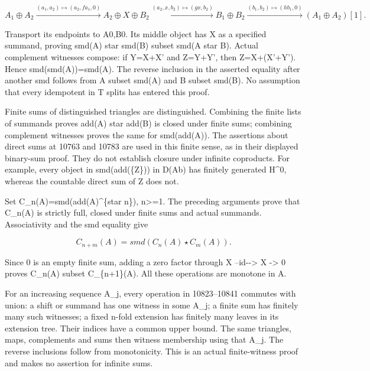 \[
 A_1\oplus A_2
 \xrightarrow{(a_1,a_2)\mapsto(a_2,f a_1,0)}
 A_2\oplus X\oplus B_2
 \xrightarrow{(a_2,x,b_2)\mapsto(gx,b_2)}
 B_1\oplus B_2
 \xrightarrow{(b_1,b_2)\mapsto(hb_1,0)}
 (A_1\oplus A_2)[1].
\]

Transport its endpoints to A0,\allowbreak{}B0. Its middle object has X as a specified summand,\allowbreak{} proving smd(A)\allowbreak{} star smd(B)\allowbreak{} subset smd(A star B)\allowbreak{}. Actual complement witnesses compose:\allowbreak{} if Y\allowbreak{}=X\allowbreak{}+X' and Z\allowbreak{}=Y\allowbreak{}+Y',\allowbreak{} then Z\allowbreak{}=X\allowbreak{}+(X'\allowbreak{}+Y')\allowbreak{}. Hence smd(smd(A)\allowbreak{})\allowbreak{}\allowbreak{}=smd(A)\allowbreak{}. The reverse inclusion in the asserted equality after another smd follows from A subset smd(A)\allowbreak{} and B subset smd(B)\allowbreak{}. No assumption that every idempotent in T splits has entered this proof.

Finite sums of distinguished triangles are distinguished. Combining the finite lists of summands proves add(A)\allowbreak{} star add(B)\allowbreak{} is closed under finite sums; combining complement witnesses proves the same for smd(add(A)\allowbreak{})\allowbreak{}. The assertions about direct sums at 10763 and 10783 are used in this finite sense,\allowbreak{} as in their displayed binary-sum proof. They do not establish closure under infinite coproducts. For example,\allowbreak{} every object in smd(add(\{Z\})\allowbreak{})\allowbreak{} in D(Ab)\allowbreak{} has finitely generated H\textasciicircum{}0,\allowbreak{} whereas the countable direct sum of Z does not.

Set C\_\allowbreak{}n(A)\allowbreak{}\allowbreak{}=smd(add(A)\allowbreak{}\textasciicircum{}\{star n\})\allowbreak{},\allowbreak{} n>\allowbreak{}=1. The preceding arguments prove that C\_\allowbreak{}n(A)\allowbreak{} is strictly full,\allowbreak{} closed under finite sums and actual summands. Associativity and the smd equality give

\[
 C_{n+m}(A)=smd(C_n(A)\star C_m(A)).
\]

Since 0 is an empty finite sum,\allowbreak{} adding a zero factor through X --id-\allowbreak{}-> X \allowbreak{}-> 0 proves C\_\allowbreak{}n(A)\allowbreak{} subset C\_\allowbreak{}\{n\allowbreak{}+1\}(A)\allowbreak{}. All these operations are monotone in A.

For an increasing sequence A\_\allowbreak{}j,\allowbreak{} every operation in 10823–\allowbreak{}10841 commutes with union:\allowbreak{} a shift or summand has one witness in some A\_\allowbreak{}j; a finite sum has finitely many such witnesses; a fixed n-fold extension has finitely many leaves in its extension tree. Their indices have a common upper bound. The same triangles,\allowbreak{} maps,\allowbreak{} complements and sums then witness membership using that A\_\allowbreak{}j. The reverse inclusions follow from monotonicity. This is an actual finite-witness proof and makes no assertion for infinite sums.

